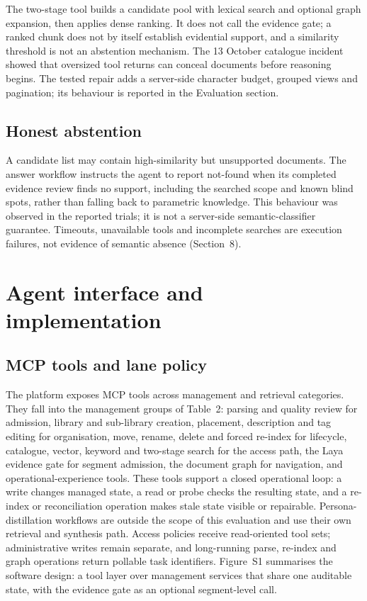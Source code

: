 \documentclass[11pt]{article}
\begin{document}
The two-stage tool builds a candidate pool with lexical search and optional
graph expansion, then applies dense ranking. It does not call the
evidence gate; a ranked chunk does not by itself establish evidential support,
and a similarity threshold is not an abstention mechanism. The 13 October catalogue
incident showed that oversized tool returns can conceal documents before
reasoning begins. The tested repair adds a server-side character budget,
grouped views and pagination; its behaviour is reported in the Evaluation
section.

\subsection{Honest abstention}
A candidate list may contain high-similarity but unsupported documents. The
answer workflow instructs the agent to report not-found when its completed
evidence review finds no support, including the searched scope and known blind
spots, rather than falling back to parametric knowledge. This behaviour was
observed in the reported trials; it is not a server-side semantic-classifier
guarantee. Timeouts, unavailable tools and incomplete searches are execution
failures, not evidence of semantic absence (Section~8).


\section{Agent interface and implementation}



\subsection{MCP tools and lane policy}


The platform exposes MCP tools across management and retrieval categories. They
fall into the management groups of Table~2: parsing and
quality review for admission, library and sub-library creation, placement,
description and tag editing for organisation, move, rename, delete and forced
re-index for lifecycle, catalogue, vector, keyword and two-stage search for the
access path, the Laya evidence gate for segment admission, the document graph
for navigation, and operational-experience tools. These tools support a
closed operational loop: a write changes managed state, a read or probe checks
the resulting state, and a re-index or reconciliation operation makes stale
state visible or repairable. Persona-distillation workflows are outside the
scope of this evaluation and use their own retrieval and synthesis path.
Access policies receive read-oriented tool sets; administrative writes remain
separate, and long-running parse, re-index and graph operations return
pollable task identifiers. Figure~S1 summarises the software design: a tool
layer over management services that share one auditable state, with the
evidence gate as an optional segment-level call.
\end{document}
